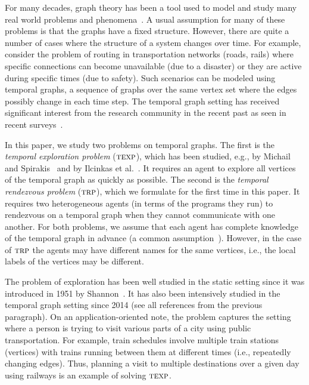 \documentclass[10pt,a4paper]{article}
\newcommand{\trp}{\textsc{trp}}
\newcommand{\texp}{\textsc{texp}}
\begin{document}
For many decades, graph theory has been a tool used to model and study many real
world problems and phenomena~\cite{BondyM76}. A usual assumption for many of
these problems is that the graphs have a fixed structure. However, there are
quite a number of cases where the structure of a system changes over time. For
example, consider the problem of routing in transportation networks (roads,
rails) where specific connections can become unavailable (due to a disaster) or
they are active during specific times (due to safety). Such scenarios can be
modeled using temporal graphs, a sequence of graphs over the same vertex set
where the edges possibly change in each time step. The temporal graph setting
has received significant interest from the research community in the recent past
as seen in recent surveys~\cite{CasteigtsFQS12,Michail16}. 

In this paper, we study two problems on temporal graphs. The first is the
\textit{temporal exploration problem} ($\texp$), which has been studied, e.g., by Michail and
Spirakis~\cite{MichailS14,MichailS16} and by Ilcinkas et
al.~\cite{IlcinkasKW14}. It requires an agent to explore all vertices of the
temporal graph as quickly as possible. The second is the \textit{temporal
rendezvous problem} ($\trp$), which we formulate for the first time in this
paper. It requires two heterogeneous agents (in terms of the programs they run)
to rendezvous on a temporal graph when they cannot communicate with one another.
For both problems, we assume that each  agent has complete knowledge of the
temporal graph in advance (a common
assumption~\cite{AdamsonGMZ22,BodlaenderV19,ErlebachHK21,ErlebachKLSS19,ErlebachS22a,ErlebachS22b,IlcinkasKW14,MichailS14,MichailS16,Taghian20}).
However, in the case of $\trp$ the agents may have different names for the same
vertices, i.e., the local labels of the vertices may be different. 

The problem of exploration has been well studied in the static setting since it was introduced in 1951 by Shannon~\cite{Shannon51}.  
It has also been intensively studied in the temporal graph setting since
2014 (see all references from the previous paragraph).
On an application-oriented note, the problem captures the setting where a person
is trying to visit various parts of a city using %
public
transportation. For example, train schedules involve multiple train
stations (vertices) with trains running between them at different times (i.e.,
repeatedly
changing edges). Thus, planning a visit to multiple destinations
over a given day using railways is an example of solving $\texp$.
\end{document}
